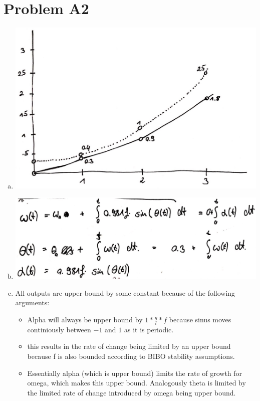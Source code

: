 \documentclass[12pt]{article}
\begin{document}
\section*{Problem A2}
\begin{enumerate}[a)]
  \item 
      \includegraphics[scale = 0.22]{pictures/pa2a}\\
  \item 
      \includegraphics[scale = 0.22]{pictures/pa2b}\\
  \item All outputs are upper bound by some constant because of the following arguments:
  \begin{itemize}
    \item Alpha will always be upper bound by $1* \frac{g}{l} * f$ because sinus moves continiously between $-1$ and $1$ as it is periodic.
    \item this results in the rate of change being limited by an upper bound because f is also bounded according to BIBO stability assumptions.
    \item Essentially alpha (which is upper bound) limits the rate of growth for omega, which makes this upper bound. Analogously theta is limited by the limited rate of change introduced by omega being upper bound.

  \end{itemize}
\end{enumerate}
\end{document}
